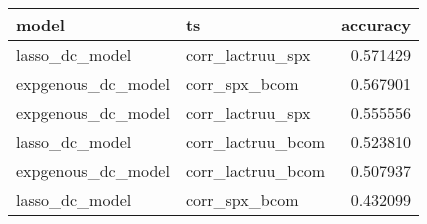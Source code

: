 \begin{tabular}{llr}
\toprule
model & ts & accuracy \\
\midrule
lasso_dc_model & corr_lactruu_spx & 0.571429 \\
expgenous_dc_model & corr_spx_bcom & 0.567901 \\
expgenous_dc_model & corr_lactruu_spx & 0.555556 \\
lasso_dc_model & corr_lactruu_bcom & 0.523810 \\
expgenous_dc_model & corr_lactruu_bcom & 0.507937 \\
lasso_dc_model & corr_spx_bcom & 0.432099 \\
\bottomrule
\end{tabular}
